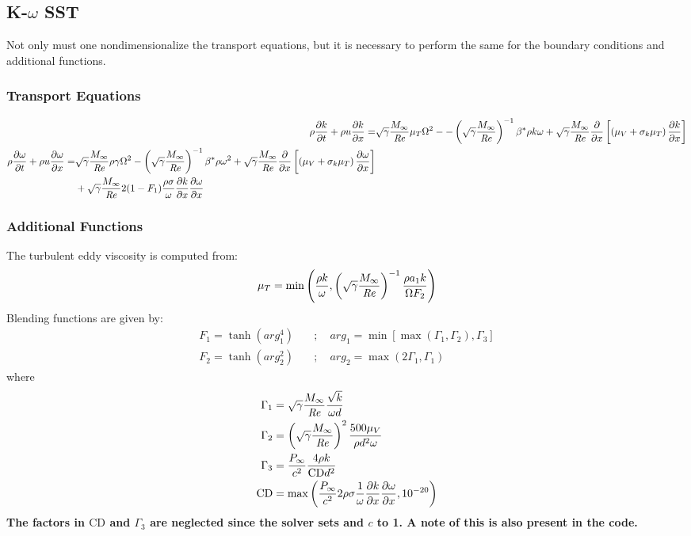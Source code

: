 \documentclass{SelimArticle}
\begin{document}
\subsection{K-$\omega$ SST}
Not only must one nondimensionalize the transport equations, but it is necessary to perform
the same for the boundary conditions and additional functions.
\subsubsection{Transport Equations}
\begin{align}
    \rho \frac{\partial k}{\partial t}  + \rho u  \frac{\partial k}{\partial x}  =&  \sqrt{\gamma}\frac{M_\infty}{\mathit{Re}}  \mu_T \Omega^2 -
        - \left( \sqrt{\gamma}\frac{M_\infty}{\mathit{Re}} \right)^{-1}\beta^*\rho k\omega
        +  \sqrt{\gamma}\frac{M_\infty}{\mathit{Re}}  \frac{\partial }{\partial x} \left[ \left(\mu_V + \sigma_k\mu_T\right) \frac{\partial k}{\partial x}  \right]\\
    \begin{split}
    \rho \frac{\partial \omega}{\partial t}  + \rho u  \frac{\partial \omega}{\partial x}  =&  \sqrt{\gamma}\frac{M_\infty}{\mathit{Re}} \rho\gamma\Omega^2
        - \left( \sqrt{\gamma}\frac{M_\infty}{\mathit{Re}} \right)^{-1}\beta^*\rho\omega^2
        +  \sqrt{\gamma}\frac{M_\infty}{\mathit{Re}}  \frac{\partial }{\partial x} \left[ \left(\mu_V + \sigma_k\mu_T\right) \frac{\partial \omega}{\partial x}  \right]\\
        &+  \sqrt{\gamma}\frac{M_\infty}{\mathit{Re}}  2(1 - F_1)\frac{\rho \sigma}{\omega} \frac{\partial k}{\partial x}  \frac{\partial \omega}{\partial x} 
    \end{split}
\end{align}
\subsubsection{Additional Functions}
The turbulent eddy viscosity is computed from:
\begin{equation}
    \mu_T = \min\left(
        \frac{\rho k}{\omega},
        \left( \sqrt{\gamma}\frac{M_\infty}{\mathit{Re}} \right)^{-1}\frac{\rho a_1 k}{\Omega F_2}
    \right)
\end{equation}
Blending functions are given by:
\begin{align*}
    F_1 = \tanh(arg_1^4)\quad &; \quad arg_1
        = \min\left[\max(\Gamma_1, \Gamma_2), \Gamma_3 \right]
    \\
    F_2 = \tanh(arg_2^2)\quad &; \quad arg_2 = \max\left(2\Gamma_1, \Gamma_1\right)
\end{align*}
where
\begin{align}
    \Gamma_1 &=  \sqrt{\gamma}\frac{M_\infty}{\mathit{Re}}  \frac{\sqrt{k}}{\omega d}\\
    \Gamma_2 &= \left( \sqrt{\gamma}\frac{M_\infty}{\mathit{Re}} \right)^2 \frac{500\mu_V}{\rho d^2 \omega}\\
    \Gamma_3 &= \frac{P_\infty}{c^2}\frac{4\rho k}{\text{CD} d^2}\\
    \text{CD}       &= \max\left(
        \frac{P_\infty}{c^2}2\rho\sigma\frac{1}{\omega} \frac{\partial k}{\partial x}  \frac{\partial \omega}{\partial x} ,
        10^{-20}
    \right)
\end{align}
\textbf{The factors in $\text{CD}$ and $\Gamma_3$ are neglected since the solver sets
\pinf and $c$ to 1.  A note of this is also present in the code.}
\end{document}
